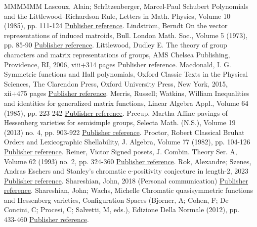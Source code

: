 \documentclass[11pt]{article}
\theoremstyle{definition}
\numberwithin{equation}{section}
\begin{document}
\begin{thebibliography}{MMMMMM}
 Lascoux, Alain; Schützenberger, Marcel-Paul Schubert Polynomials and the Littlewood–Richardson Rule, Letters in Math. Physics, Volume 10 (1985), pp. 111-124 \href{https://alco.centre-mersenne.org/articles/10.5802/alco.459/#LS2}{Publisher reference}.
 Lindström, Berndt On the vector representations of induced matroids, Bull. London Math. Soc., Volume 5 (1973), pp. 85-90 \href{https://alco.centre-mersenne.org/articles/10.5802/alco.459/#LinVrep}{Publisher reference}.
 Littlewood, Dudley E. The theory of group characters and matrix representations of groups, AMS Chelsea Publishing, Providence, RI, 2006, viii+314 pages \href{https://alco.centre-mersenne.org/articles/10.5802/alco.459/#LittlewoodTGC}{Publisher reference}.
 Macdonald, I. G. Symmetric functions and Hall polynomials, Oxford Classic Texts in the Physical Sciences, The Clarendon Press, Oxford University Press, New York, 2015, xii+475 pages \href{https://alco.centre-mersenne.org/articles/10.5802/alco.459/#M1}{Publisher reference}.
 Merris, Russell; Watkins, William Inequalities and identities for generalized matrix functions, Linear Algebra Appl., Volume 64 (1985), pp. 223-242 \href{https://alco.centre-mersenne.org/articles/10.5802/alco.459/#MerWatIneq}{Publisher reference}.
 Precup, Martha Affine pavings of Hessenberg varieties for semisimple groups, Selecta Math. (N.S.), Volume 19 (2013) no. 4, pp. 903-922 \href{https://alco.centre-mersenne.org/articles/10.5802/alco.459/#PrecupAffine}{Publisher reference}.
 Proctor, Robert Classical Bruhat Orders and Lexicographic Shellability, J. Algebra, Volume 77 (1982), pp. 104-126 \href{https://alco.centre-mersenne.org/articles/10.5802/alco.459/#ProctorBruhat}{Publisher reference}.
 Reiner, Victor Signed posets, J. Combin. Theory Ser. A, Volume 62 (1993) no. 2, pp. 324-360 \href{https://alco.centre-mersenne.org/articles/10.5802/alco.459/#ReinerParset}{Publisher reference}.
 Rok, Alexandre; Szenes, Andras Eschers and Stanley’s chromatic e-positivity conjecture in length-2, 2023 \href{https://alco.centre-mersenne.org/articles/10.5802/alco.459/#RSEschers}{Publisher reference}.
 Shareshian, John, 2018 (Personal communication) \href{https://alco.centre-mersenne.org/articles/10.5802/alco.459/#ShareshianComm18}{Publisher reference}.
 Shareshian, John; Wachs, Michelle Chromatic quasisymmetric functions and Hessenberg varieties, Configuration Spaces (Bjorner, A; Cohen, F; De Concini, C; Procesi, C; Salvetti, M, eds.), Edizione Della Normale (2012), pp. 433-460 \href{https://alco.centre-mersenne.org/articles/10.5802/alco.459/#SWachsChromQ}{Publisher reference}.

\end{thebibliography}
\end{document}
